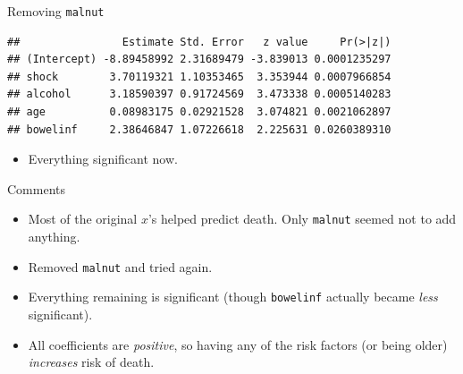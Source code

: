\begin{frame}[fragile]{Removing \texttt{malnut}}

 
\begin{knitrout}
\color{fgcolor}\begin{kframe}
\begin{alltt}
\hlkwb{=}\hlopt{~}\hlopt{+}\hlopt{+}\hlopt{+}
              \hlstd{=}\hlstd{)}
\hlopt{$}
\end{alltt}
\begin{verbatim}
##                Estimate Std. Error   z value     Pr(>|z|)
## (Intercept) -8.89458992 2.31689479 -3.839013 0.0001235297
## shock        3.70119321 1.10353465  3.353944 0.0007966854
## alcohol      3.18590397 0.91724569  3.473338 0.0005140283
## age          0.08983175 0.02921528  3.074821 0.0021062897
## bowelinf     2.38646847 1.07226618  2.225631 0.0260389310
\end{verbatim}
\end{kframe}
\end{knitrout}

\begin{itemize}
\item Everything significant now.
\end{itemize}
  
 
  
\end{frame}

\begin{frame}[fragile]{Comments}

  \begin{itemize}
\item Most of the original $x$'s helped predict death. Only \texttt{malnut} seemed not to add anything.
\item Removed \texttt{malnut} and tried again.
\item Everything remaining is significant (though \texttt{bowelinf}
  actually became \emph{less} significant).
\item All coefficients are \emph{positive}, so having any of the risk
  factors (or being older)
  \emph{increases} risk of death.  
\end{itemize}

\end{frame}


